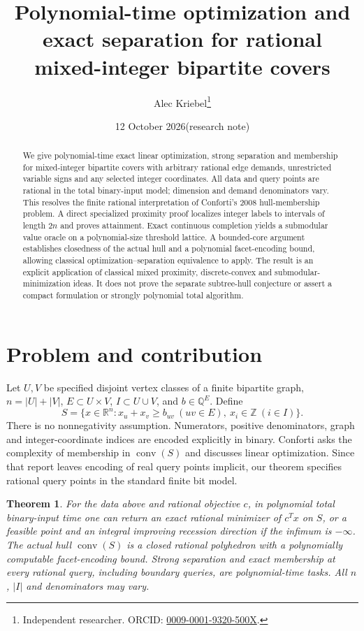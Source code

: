 \documentclass[11pt]{article}
\title{Polynomial-time optimization and exact separation\newline
for rational mixed-integer bipartite covers}
\author{Alec Kriebel\thanks{Independent researcher. ORCID:
\href{https://orcid.org/0009-0001-9320-500X}{0009-0001-9320-500X}.}}
\date{12 October 2026\quad (research note)}
\newtheorem{theorem}{Theorem}
\newcommand{\R}{\mathbb R}
\newcommand{\Z}{\mathbb Z}
\newcommand{\Q}{\mathbb Q}
\newcommand{\conv}{\operatorname{conv}}
\begin{document}
\maketitle
\begin{abstract}
We give polynomial-time exact linear optimization, strong separation and
membership for mixed-integer bipartite covers with arbitrary rational edge
demands, unrestricted variable signs and any selected integer coordinates.
All data and query points are rational in the total binary-input model;
dimension and demand denominators vary. This resolves the finite rational
interpretation of Conforti's 2008 hull-membership problem. A direct specialized
proximity proof localizes integer labels to intervals of length $2n$ and
proves attainment. Exact continuous completion yields a submodular value
oracle on a polynomial-size threshold lattice. A bounded-core argument
establishes closedness of the actual hull and a polynomial facet-encoding
bound, allowing classical optimization--separation equivalence to apply.
The result is an explicit application of classical mixed proximity,
discrete-convex and submodular-minimization ideas. It does not prove the
separate subtree-hull conjecture or assert a compact formulation or strongly
polynomial total algorithm.
\end{abstract}

\section{Problem and contribution}
Let $U,V$ be specified disjoint vertex classes of a finite bipartite graph,
$n=|U|+|V|$, $E\subset U\times V$, $I\subset U\cup V$, and $b\in\Q^E$.
Define
\[
 S=\{x\in\R^n:x_u+x_v\ge b_{uv}\ (uv\in E),\ x_i\in\Z\ (i\in I)\}.
\]
There is no nonnegativity assumption. Numerators, positive denominators,
graph and integer-coordinate indices are encoded explicitly in binary.
Conforti \cite[pp.~2904--2905, Problem~1]{OWR} asks the complexity of membership
in $\conv(S)$ and discusses linear optimization. Since that report leaves
encoding of real query points implicit, our theorem specifies rational query
points in the standard finite bit model.

\begin{theorem}\label{thm:main}
For the data above and rational objective $c$, in polynomial total binary-input
time one can return an exact rational minimizer of $c^Tx$ on $S$, or a feasible
point and an integral improving recession direction if the infimum is
$-\infty$. The actual hull $\conv(S)$ is a closed rational polyhedron with a
polynomially computable facet-encoding bound. Strong separation and exact
membership at every rational query, including boundary queries, are
polynomial-time tasks. All $n$, $|I|$ and denominators may vary.
\end{theorem}
\end{document}
